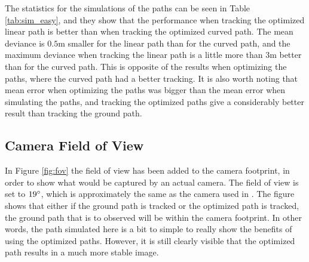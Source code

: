 The statistics for the simulations of the paths can be seen in Table \ref{tab:sim_easy}, and they show that the performance when tracking the optimized linear path is better than when tracking the optimized curved path. The mean deviance is $0.5$m smaller for the linear path than for the curved path, and the maximum deviance when tracking the linear path is a little more than $3$m better than for the curved path. This is opposite of the results when optimizing the paths, where the curved path had a better tracking. It is also worth noting that mean error when optimizing the paths was bigger than the mean error when simulating the paths, and tracking the optimized paths give a considerably better result than tracking the ground path.


\subsection{Camera Field of View}

In Figure \ref{fig:fov} the field of view has been added to the camera footprint, in order to show what would be captured by an actual camera. The field of view is set to $19\degree$, which is approximately the same as the camera used in \cite{hymsySUOMALAINEN}. The figure shows that either if the ground path is tracked or the optimized path is tracked, the ground path that is to observed will be within the camera footprint. In other words, the path simulated here is a bit to simple to really show the benefits of using the optimized paths. However, it is still clearly visible that the optimized path results in a much more stable image.


